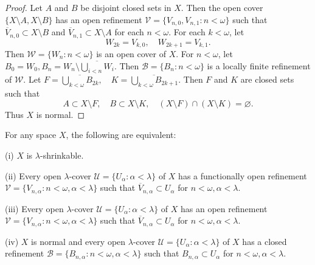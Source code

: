 \documentclass[jisng5i.tex]{subfiles}
\begin{document}
\begin{proof}
Let \(A\) and \(B\) be disjoint closed sets in \(X\). Then the open cover 
\(\{ X \setminus A, X \setminus B \}\) has an open refinement 
\(\mathscr{V} = \{ V_{n,0}, V_{n,1}: n < \omega \}\) such that 
\(\overline{V}_{n,0} \subset X \setminus B\) and
\(\overline{V}_{n,1} \subset X \setminus A\) for each \(n < \omega\).
For each \(k < \omega\), let 
$$W_{2k} = V_{k,0}, \quad W_{2k+1} = V_{k,1}.$$
Then \(\mathscr{W} = \{ W_n: n < \omega \}\) is an open cover of \(X\). 
For \(n < \omega\), let 
\(B_0 = W_0, B_n = W_n \setminus \overline{\bigcup_{i<n}W_i}\).
Then \(\mathscr{B} = \{ B_n: n < \omega \}\) is a locally finite refinement of \(\mathscr{W}\).
Let $F = \overline{\bigcup_{k<\omega} B_{2k}}, \quad K = \overline{\bigcup_{k<\omega} B_{2k+1}}.$
Then  \(F\) and \(K\) are closed sets such that 
$$A \subset X \setminus F, \quad
B \subset X \setminus K, \quad
(X \setminus F) \cap (X \setminus K) = \varnothing.$$
Thus \(X\) is normal.
\end{proof}


{\theorem{} \label{th:5.2.7}
For any space $X$, the following are equivalent:

\textup{(i)} \(X\) is \(\lambda\)-shrinkable.

\textup{(ii)} Every open \(\lambda\)-cover \(\mathscr{U}=\{U_\alpha: \alpha < \lambda\}\) of \(X\) 
has a functionally open refinement \(\mathscr{V} = \{ V_{n,\alpha}: n < \omega, \alpha < \lambda \}\) 
such that \(\overline{V}_{n,\alpha} \subset U_\alpha\) for $n < \omega, \alpha < \lambda$.

\textup{(iii)} Every open \(\lambda\)-cover \(\mathscr{U}=\{U_\alpha: \alpha < \lambda\}\) of \(X\) 
has an open refinement \(\mathscr{V} = \{ V_{n,\alpha}: n < \omega, \alpha < \lambda \}\) 
such that \(\overline{V}_{n,\alpha} \subset U_\alpha\) for $n < \omega, \alpha < \lambda$.

\textup{(iv)} \(X\) is normal and every open \(\lambda\)-cover  
\(\mathscr{U}=\{U_\alpha: \alpha < \lambda\}\) of \(X\) 
has a closed refinement \(\mathscr{B} = \{ B_{n,\alpha}: n < \omega, \alpha < \lambda \}\) 
such that \(B_{n,\alpha} \subset U_\alpha\) for $n < \omega, \alpha < \lambda$.
}
\end{document}
